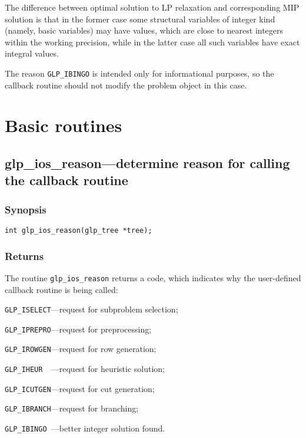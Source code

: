 The difference between optimal solution to LP relaxation and
corresponding MIP solution is that in the former case some structural
variables of integer kind (namely, basic variables) may have values,
which are close to nearest integers within the working precision, while
in the latter case all such variables have exact integral values.

The reason \verb|GLP_IBINGO| is intended only for informational
purposes, so the callback routine should not modify the problem object
in this case.


\newpage

\section{Basic routines}

\subsection{glp\_ios\_reason---determine reason for calling the
callback routine}

\subsubsection*{Synopsis}

\begin{verbatim}
int glp_ios_reason(glp_tree *tree);
\end{verbatim}

\subsubsection*{Returns}

The routine \verb|glp_ios_reason| returns a code, which indicates why
the user-defined callback routine is being called:

\verb|GLP_ISELECT|---request for subproblem selection;

\verb|GLP_IPREPRO|---request for preprocessing;

\verb|GLP_IROWGEN|---request for row generation;

\verb|GLP_IHEUR  |---request for heuristic solution;

\verb|GLP_ICUTGEN|---request for cut generation;

\verb|GLP_IBRANCH|---request for branching;

\verb|GLP_IBINGO |---better integer solution found.

